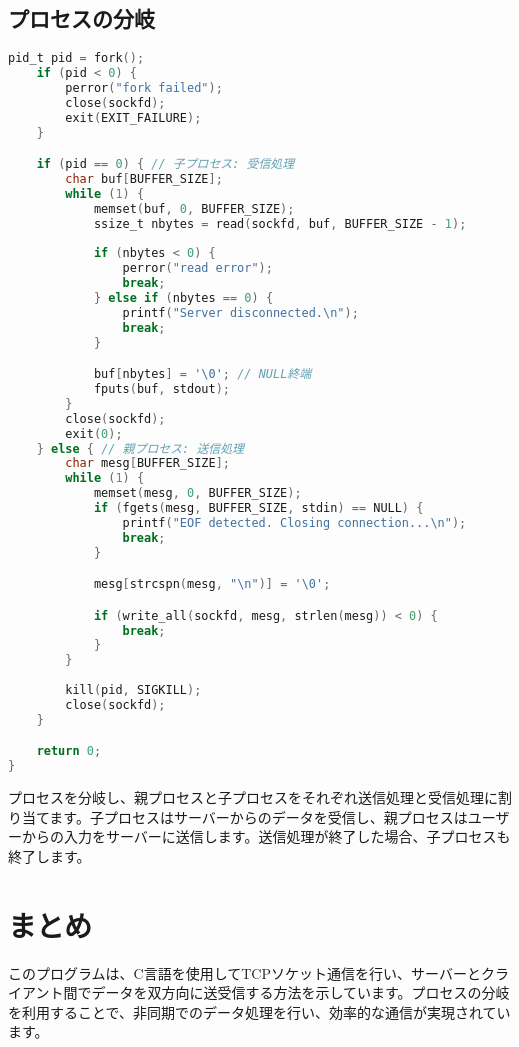 \documentclass{article}
\begin{document}
\subsection{プロセスの分岐}
\begin{lstlisting}[language=C]
    pid_t pid = fork();
    if (pid < 0) {
        perror("fork failed");
        close(sockfd);
        exit(EXIT_FAILURE);
    }

    if (pid == 0) { // 子プロセス: 受信処理
        char buf[BUFFER_SIZE];
        while (1) {
            memset(buf, 0, BUFFER_SIZE);
            ssize_t nbytes = read(sockfd, buf, BUFFER_SIZE - 1);
            
            if (nbytes < 0) {
                perror("read error");
                break;
            } else if (nbytes == 0) { 
                printf("Server disconnected.\n");
                break;
            }

            buf[nbytes] = '\0'; // NULL終端
            fputs(buf, stdout);
        }
        close(sockfd);
        exit(0);
    } else { // 親プロセス: 送信処理
        char mesg[BUFFER_SIZE];
        while (1) {
            memset(mesg, 0, BUFFER_SIZE);
            if (fgets(mesg, BUFFER_SIZE, stdin) == NULL) {
                printf("EOF detected. Closing connection...\n");
                break;
            }

            mesg[strcspn(mesg, "\n")] = '\0';

            if (write_all(sockfd, mesg, strlen(mesg)) < 0) {
                break;
            }
        }
        
        kill(pid, SIGKILL);
        close(sockfd);
    }

    return 0;
}
\end{lstlisting}
プロセスを分岐し、親プロセスと子プロセスをそれぞれ送信処理と受信処理に割り当てます。子プロセスはサーバーからのデータを受信し、親プロセスはユーザーからの入力をサーバーに送信します。送信処理が終了した場合、子プロセスも終了します。

\section{まとめ}
このプログラムは、C言語を使用してTCPソケット通信を行い、サーバーとクライアント間でデータを双方向に送受信する方法を示しています。プロセスの分岐を利用することで、非同期でのデータ処理を行い、効率的な通信が実現されています。
\end{document}
